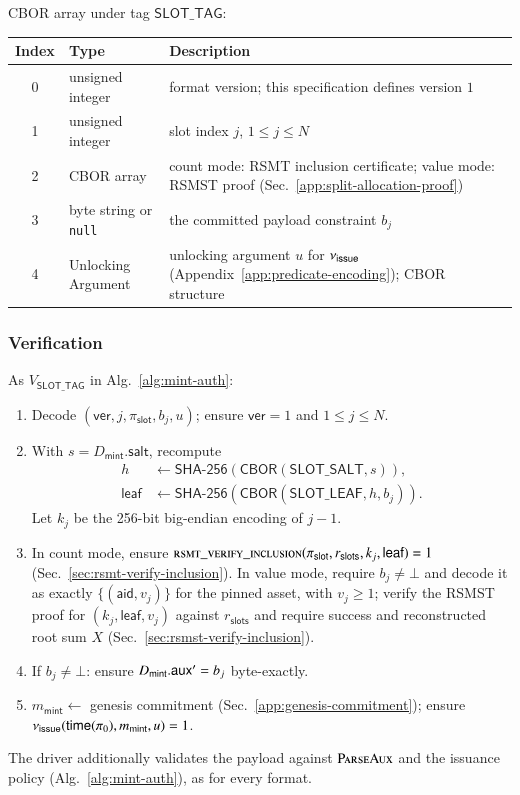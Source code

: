 CBOR array under tag $\mathsf{SLOT\_TAG}$:

\begin{longtable}{clp{8.6cm}}
\textbf{Index} & \textbf{Type} & \textbf{Description} \\
\hline
0 & unsigned integer & format version; this specification defines version $1$ \\
1 & unsigned integer & slot index $j$, $1 \le j \le N$ \\
2 & CBOR array & count mode: RSMT inclusion certificate; value mode: RSMST proof (Sec.~\ref{app:split-allocation-proof}) \\
3 & byte string or \texttt{null} & the committed payload constraint $b_j$ \\
4 & Unlocking Argument & unlocking argument $u$ for $\nu_\mathsf{issue}$ (Appendix~\ref{app:predicate-encoding}); CBOR structure \\
\end{longtable}

\subsubsection{Verification}

As $V_{\mathsf{SLOT\_TAG}}$ in Alg.~\ref{alg:mint-auth}:
\begin{enumerate}
	\item Decode $(\mathsf{ver}, j, \pi_\mathsf{slot}, b_j, u)$; ensure $\mathsf{ver} = 1$ and $1 \le j \le N$.
	\item With $s=D_\mathsf{mint}.\mathsf{salt}$, recompute
\[
\begin{aligned}
h &\gets \mathsf{SHA\text{-}256}(\mathsf{CBOR}(\mathsf{SLOT\_SALT},s)),\\
\mathsf{leaf} &\gets \mathsf{SHA\text{-}256}(\mathsf{CBOR}(\mathsf{SLOT\_LEAF},h,b_j)).
\end{aligned}
\]
Let $k_j$ be the 256-bit big-endian encoding of $j-1$.
	\item In count mode, ensure $\textsc{rsmt\_verify\_inclusion}(\pi_\mathsf{slot}, r_\mathsf{slots}, k_j, \mathsf{leaf}) = 1$ (Sec.~\ref{sec:rsmt-verify-inclusion}). In value mode, require $b_j \ne \bot$ and decode it as exactly $\{(\mathsf{aid},v_j)\}$ for the pinned asset, with $v_j \ge 1$; verify the RSMST proof for $(k_j,\mathsf{leaf},v_j)$ against $r_\mathsf{slots}$ and require success and reconstructed root sum $X$ (Sec.~\ref{sec:rsmst-verify-inclusion}).
	\item If $b_j \ne \bot$: ensure $D_\mathsf{mint}.\mathsf{aux}' = b_j$ byte-exactly.
	\item $m_\mathsf{mint} \gets$ genesis commitment (Sec.~\ref{app:genesis-commitment}); ensure $\nu_\mathsf{issue}(\mathsf{time}(\pi_0), m_\mathsf{mint}, u) = 1$.
\end{enumerate}
The driver additionally validates the payload against $\Call{ParseAux}{}$ and the issuance policy (Alg.~\ref{alg:mint-auth}), as for every format.

